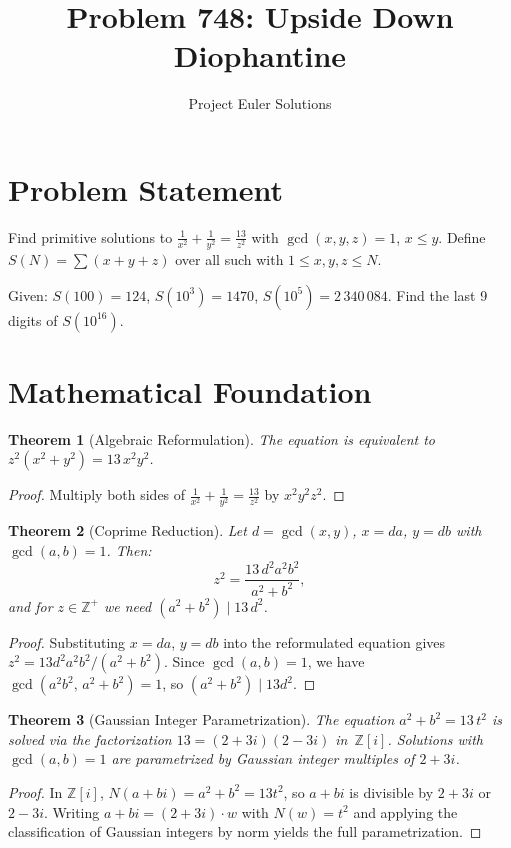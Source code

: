 \documentclass[11pt]{article}
\title{Problem 748: Upside Down Diophantine}
\author{Project Euler Solutions}
\date{}
\newtheorem{theorem}{Theorem}
\theoremstyle{definition}
\begin{document}
\maketitle

\section{Problem Statement}

Find primitive solutions to $\frac{1}{x^2}+\frac{1}{y^2}=\frac{13}{z^2}$ with $\gcd(x,y,z)=1$, $x \le y$. Define $S(N) = \sum(x+y+z)$ over all such with $1 \le x,y,z \le N$.

Given: $S(100)=124$, $S(10^3)=1470$, $S(10^5)=2\,340\,084$. Find the last 9 digits of $S(10^{16})$.

\section{Mathematical Foundation}

\begin{theorem}[Algebraic Reformulation]
The equation is equivalent to $z^2(x^2+y^2) = 13\,x^2 y^2$.
\end{theorem}

\begin{proof}
Multiply both sides of $\frac{1}{x^2}+\frac{1}{y^2}=\frac{13}{z^2}$ by $x^2 y^2 z^2$.
\end{proof}

\begin{theorem}[Coprime Reduction]
Let $d = \gcd(x,y)$, $x = da$, $y = db$ with $\gcd(a,b)=1$. Then:
\[
z^2 = \frac{13\,d^2 a^2 b^2}{a^2+b^2},
\]
and for $z \in \mathbb{Z}^+$ we need $(a^2+b^2) \mid 13\,d^2$.
\end{theorem}

\begin{proof}
Substituting $x = da$, $y = db$ into the reformulated equation gives $z^2 = 13d^2 a^2 b^2/(a^2+b^2)$. Since $\gcd(a,b) = 1$, we have $\gcd(a^2 b^2,\, a^2+b^2) = 1$, so $(a^2+b^2) \mid 13d^2$.
\end{proof}

\begin{theorem}[Gaussian Integer Parametrization]
The equation $a^2+b^2 = 13\,t^2$ is solved via the factorization $13 = (2+3i)(2-3i)$ in~$\mathbb{Z}[i]$. Solutions with $\gcd(a,b)=1$ are parametrized by Gaussian integer multiples of $2+3i$.
\end{theorem}

\begin{proof}
In $\mathbb{Z}[i]$, $N(a+bi) = a^2+b^2 = 13t^2$, so $a+bi$ is divisible by $2+3i$ or $2-3i$. Writing $a+bi = (2+3i)\cdot w$ with $N(w) = t^2$ and applying the classification of Gaussian integers by norm yields the full parametrization.
\end{proof}
\end{document}
